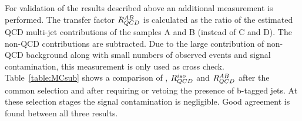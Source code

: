 
For validation of the results described above an additional measurement is performed.
The transfer factor $R_{QCD}^{AB}$ is calculated as the ratio of the estimated QCD multi-jet contributions of the samples A 
and B (instead of C and D). The non-QCD contributions are subtracted. Due to the large contribution of non-QCD background 
along with small numbers of observed events and signal contamination, this measurement is only used as cross check. Table~\ref{table:MCsub} shows 
a comparison of \rqcd, $R_{QCD}^{iso}$ and $R_{QCD}^{AB}$ after the common selection and after requiring
or vetoing the presence of b-tagged jets.  At these selection stages the signal contamination is negligible. 
Good agreement is found between all three results. 


